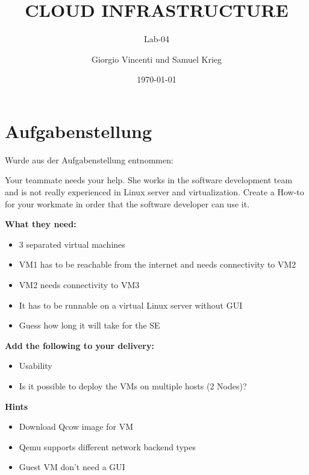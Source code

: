 \documentclass[a4,12pt]{scrartcl}
\title{CLOUD INFRASTRUCTURE}
\subtitle{Lab-04}
\author{Giorgio Vincenti und Samuel Krieg}
\date{\today}
\begin{document}
\clearpage\maketitle
\thispagestyle{empty}
\tableofcontents

\section{Aufgabenstellung}
Wurde aus der Aufgabenstellung entnommen:

\noindent Your teammate needs your help. She works in the software development team and is not really experienced in Linux server and virtualization. Create a How-to for your workmate in order that the software developer can use it.

\noindent \textbf{What they need:}
\begin{itemize}
\item 3 separated virtual machines
\item  VM1 has to be reachable from the internet and needs connectivity to VM2
\item VM2 needs connectivity to VM3
\item It has to be runnable on a virtual Linux server without GUI
\item Guess how long it will take for the SE
\end{itemize}

\textbf{Add the following to your delivery:}
\begin{itemize}
\item Usability
\item Is it possible to deploy the VMs on multiple hosts (2 Nodes)?
\end{itemize}

\textbf{Hints}
\begin{itemize}
\item Download Qcow image for VM
\item Qemu supports different network backend types
\item Guest VM don’t need a GUI
\end{itemize}
\end{document}
